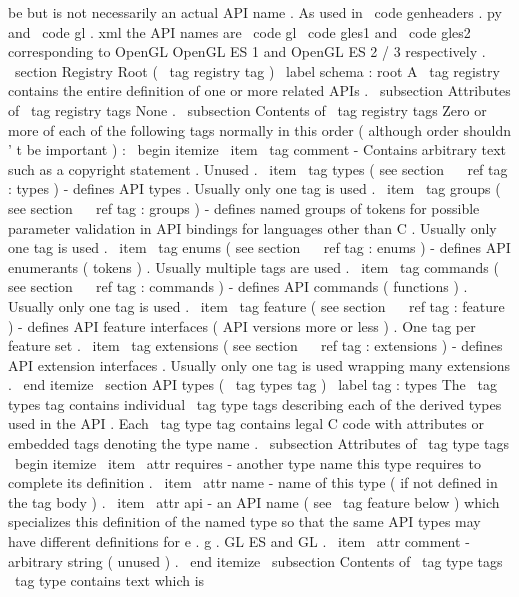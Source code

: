 be
but
is
not
necessarily
an
actual
API
name
.
As
used
in
\
code
{
genheaders
.
py
}
and
\
code
{
gl
.
xml
}
the
API
names
are
\
code
{
gl
}
\
code
{
gles1
}
and
\
code
{
gles2
}
corresponding
to
OpenGL
OpenGL
ES
1
and
OpenGL
ES
2
/
3
respectively
.
\
section
{
Registry
Root
(
\
tag
{
registry
}
tag
)
}
\
label
{
schema
:
root
}
A
\
tag
{
registry
}
contains
the
entire
definition
of
one
or
more
related
APIs
.
\
subsection
{
Attributes
of
\
tag
{
registry
}
tags
}
None
.
\
subsection
{
Contents
of
\
tag
{
registry
}
tags
}
Zero
or
more
of
each
of
the
following
tags
normally
in
this
order
(
although
order
shouldn
'
t
be
important
)
:
\
begin
{
itemize
}
\
item
\
tag
{
comment
}
-
Contains
arbitrary
text
such
as
a
copyright
statement
.
Unused
.
\
item
\
tag
{
types
}
(
see
section
~
\
ref
{
tag
:
types
}
)
-
defines
API
types
.
Usually
only
one
tag
is
used
.
\
item
\
tag
{
groups
}
(
see
section
~
\
ref
{
tag
:
groups
}
)
-
defines
named
groups
of
tokens
for
possible
parameter
validation
in
API
bindings
for
languages
other
than
C
.
Usually
only
one
tag
is
used
.
\
item
\
tag
{
enums
}
(
see
section
~
\
ref
{
tag
:
enums
}
)
-
defines
API
enumerants
(
tokens
)
.
Usually
multiple
tags
are
used
.
\
item
\
tag
{
commands
}
(
see
section
~
\
ref
{
tag
:
commands
}
)
-
defines
API
commands
(
functions
)
.
Usually
only
one
tag
is
used
.
\
item
\
tag
{
feature
}
(
see
section
~
\
ref
{
tag
:
feature
}
)
-
defines
API
feature
interfaces
(
API
versions
more
or
less
)
.
One
tag
per
feature
set
.
\
item
\
tag
{
extensions
}
(
see
section
~
\
ref
{
tag
:
extensions
}
)
-
defines
API
extension
interfaces
.
Usually
only
one
tag
is
used
wrapping
many
extensions
.
\
end
{
itemize
}
\
section
{
API
types
(
\
tag
{
types
}
tag
)
}
\
label
{
tag
:
types
}
The
\
tag
{
types
}
tag
contains
individual
\
tag
{
type
}
tags
describing
each
of
the
derived
types
used
in
the
API
.
Each
\
tag
{
type
}
tag
contains
legal
C
code
with
attributes
or
embedded
tags
denoting
the
type
name
.
\
subsection
{
Attributes
of
\
tag
{
type
}
tags
}
\
begin
{
itemize
}
\
item
\
attr
{
requires
}
-
another
type
name
this
type
requires
to
complete
its
definition
.
\
item
\
attr
{
name
}
-
name
of
this
type
(
if
not
defined
in
the
tag
body
)
.
\
item
\
attr
{
api
}
-
an
API
name
(
see
\
tag
{
feature
}
below
)
which
specializes
this
definition
of
the
named
type
so
that
the
same
API
types
may
have
different
definitions
for
e
.
g
.
GL
ES
and
GL
.
\
item
\
attr
{
comment
}
-
arbitrary
string
(
unused
)
.
\
end
{
itemize
}
\
subsection
{
Contents
of
\
tag
{
type
}
tags
}
\
tag
{
type
}
contains
text
which
is
